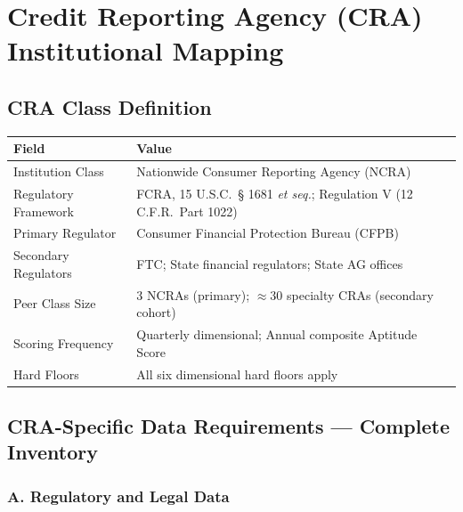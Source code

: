 \documentclass[a4paper,11pt]{article}
\begin{document}
	\newpage
	\section{Credit Reporting Agency (CRA) Institutional Mapping}
	
	\subsection{CRA Class Definition}
	
	\begin{center}
		\begin{tabular}{L{4cm} L{10cm}}
			\toprule
			\color{white}\textbf{\sffamily Field} & \color{white}\textbf{\sffamily Value} \\
			\midrule
			Institution Class & Nationwide Consumer Reporting Agency (NCRA) \\
			Regulatory Framework & FCRA, 15 U.S.C.\ § 1681 \textit{et seq.}; Regulation V (12 C.F.R.\ Part 1022) \\
			Primary Regulator & Consumer Financial Protection Bureau (CFPB) \\
			Secondary Regulators & FTC; State financial regulators; State AG offices \\
			Peer Class Size & 3 NCRAs (primary); $\approx 30$ specialty CRAs (secondary cohort) \\
			Scoring Frequency & Quarterly dimensional; Annual composite Aptitude Score \\
			Hard Floors & All six dimensional hard floors apply \\
			\bottomrule
		\end{tabular}
	\end{center}
	
	\subsection{CRA-Specific Data Requirements — Complete Inventory}
	
	\subsubsection{A. Regulatory and Legal Data}
	
\end{document}
